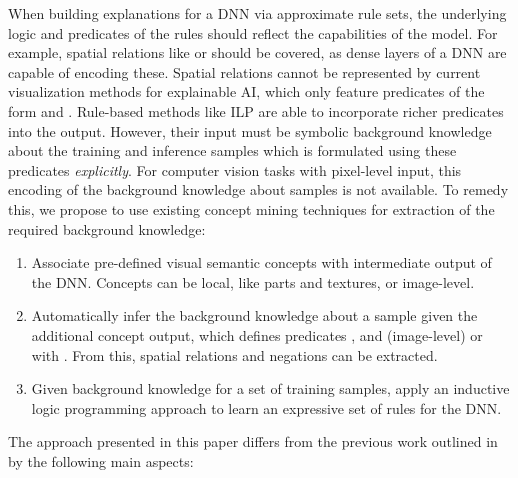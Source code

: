 When building explanations for a DNN via approximate rule sets,
the underlying logic and predicates of the rules should reflect the
capabilities of the model.
For example, spatial relations like  or
 should be covered, as \forexample dense
layers of a DNN are capable of encoding these.
% 
Spatial relations cannot be represented by current visualization
methods for explainable AI, which only feature predicates of the form
 and .
Rule-based methods like ILP are able to incorporate richer
predicates into the output. However, their input must be symbolic background
knowledge about the training and inference samples which
is formulated using these predicates \emph{explicitly}.
For computer vision tasks with pixel-level input, this
encoding of the background knowledge about samples is not available.
% 
To remedy this, we propose to use existing concept mining techniques
for extraction of the required background knowledge:
\begin{enumerate}
\item Associate pre-defined visual semantic concepts with
  intermediate output of the DNN.
  Concepts can be local, like parts and textures, or image-level.
\item Automatically infer the background knowledge about a sample
   given the additional concept output, which defines
  predicates
  , and
   (image-level) or
   with .
  From this, spatial relations and negations can be extracted.
\item Given background knowledge for a set of training samples,
  apply an inductive logic programming approach to learn an
  expressive set of rules for the DNN.
\end{enumerate}

The approach presented in this paper differs from the previous work
outlined in \cite{rabold2019enriching} by the following main aspects:

